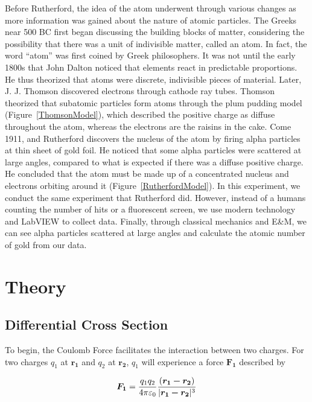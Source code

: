 Before Rutherford, the idea of the atom underwent through various changes as more information was gained about the nature of atomic particles. The Greeks near 500 BC first began discussing the building blocks of matter, considering the possibility that there was a unit of indivisible matter, called an atom. In fact, the word ``atom'' was first coined by Greek philosophers. It was not until the early 1800s that John Dalton noticed that elements react in predictable proportions. He thus theorized that atoms were discrete, indivisible pieces of material. Later, J. J. Thomson discovered electrons through cathode ray tubes. Thomson theorized that subatomic particles form atoms through the plum pudding model (Figure~\ref{ThomsonModel}), which described the positive charge as diffuse throughout the atom, whereas the electrons are the raisins in the cake. Come 1911, and Rutherford discovers the nucleus of the atom by firing alpha particles at thin sheet of gold foil. He noticed that some alpha particles were scattered at large angles, compared to what is expected if there was a diffuse positive charge. He concluded that the atom must be made up of a concentrated nucleus and electrons orbiting around it (Figure~\ref{RutherfordModel}). In this experiment, we conduct the same experiment that Rutherford did. However, instead of a humans counting the number of hits or a fluorescent screen, we use modern technology and LabVIEW to collect data. Finally, through classical mechanics and E\&M, we can see alpha particles scattered at large angles and calculate the atomic number of gold from our data.

\section{Theory}
\subsection{Differential Cross Section}

To begin, the Coulomb Force facilitates the interaction between two charges. For two charges $q_1$ at $\boldsymbol{r_1}$ and $q_2$ at $\boldsymbol{r_2}$, $q_1$ will experience a force $\boldsymbol{F_1}$ described by

\begin{equation}
   \boldsymbol{F_1}={q_1q_2\over4\pi\varepsilon_0}{(\boldsymbol{r_1-r_2})\over|\boldsymbol{r_1-r_2}|^3}
   \label{Discrete Coulomb}
\end{equation}

